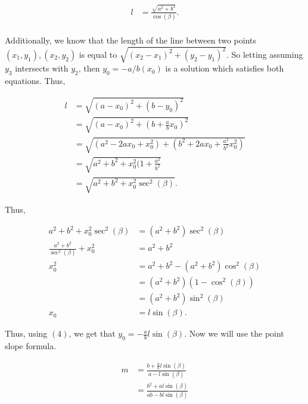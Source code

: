 \documentclass[12pt, a4paper]{article}
\begin{document}
    \begin{equation}
        \begin{split}
            l &= \frac{\sqrt{a^2+b^2}}{\cos(\beta)}. \\ 
        \end{split}
    \end{equation}
    
\vspace{4mm}

\noindent Additionally, we know that the length of the line between two points $(x_1,y_1),(x_2,y_2)$ is equal to $\sqrt{(x_2-x_1)^2+(y_2-y_1)^2}$. So letting assuming $y_3$ intersects with $y_2$, then $y_0=-a/b(x_0)$ is a solution which satisfies both equations. Thus,

    \begin{equation*}
        \begin{split}
            l &= \sqrt{(a-x_0)^2+(b-y_0)^2} \\
            &= \sqrt{(a-x_0)^2+(b+\frac{a}{b}x_0)^2} \\
            &= \sqrt{(a^2-2ax_0+x_0^2)+(b^2+2ax_0+\frac{a^2}{b^2}x_0^2)} \\
            &= \sqrt{a^2+b^2+x_0^2(1+\frac{a^2}{b^2}} \\
            &= \sqrt{a^2+b^2+x_0^2\sec^2(\beta)}.
        \end{split}
    \end{equation*}
    
\vspace{4mm}

\noindent Thus,

    \begin{equation*}
        \begin{split}
            a^2+b^2+x_0^2\sec^2(\beta) &= (a^2+b^2)\sec^2(\beta) \\
            \frac{a^2+b^2}{\sec^2(\beta)}+x_0^2 &= a^2+b^2 \\
            x_0^2 &= a^2+b^2-(a^2+b^2)\cos^2(\beta) \\
            &= (a^2+b^2)(1-\cos^2(\beta)) \\
            &= (a^2+b^2)\sin^2(\beta) \\
            x_0 &= l\sin(\beta).
        \end{split}
    \end{equation*}

\vspace{4mm}

\noindent Thus, using $(4)$, we get that $y_0=-\frac{a}{b}l\sin(\beta)$. Now we will use the point slope formula.

\newpage

    \begin{equation*}
        \begin{split}
            m &= \frac{b+\frac{a}{b}l\sin(\beta)}{a-l\sin(\beta)} \\
            &= \frac{b^2+al\sin(\beta)}{ab-bl\sin(\beta)}
        \end{split}
    \end{equation*}
\end{document}
